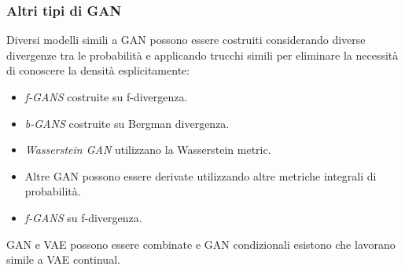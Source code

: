 		\subsubsection{Altri tipi di GAN}
		Diversi modelli simili a GAN possono essere costruiti considerando diverse divergenze tra le probabilit\`a e applicando trucchi simili per eliminare la necessit\`a di conoscere la densit\`a esplicitamente:
		\begin{multicols}{2}
			\begin{itemize}
				\item \emph{f-GANS} costruite su f-divergenza.
				\item \emph{b-GANS} costruite su Bergman divergenza.
				\item \emph{Wasserstein GAN} utilizzano la Wasserstein metric.
				\item Altre GAN possono essere derivate utilizzando altre metriche integrali di probabilit\`a.
				\item \emph{f-GANS} su f-divergenza.
			\end{itemize}
		\end{multicols}
		GAN e VAE possono essere combinate e GAN condizionali esistono che lavorano simile a VAE continual.
